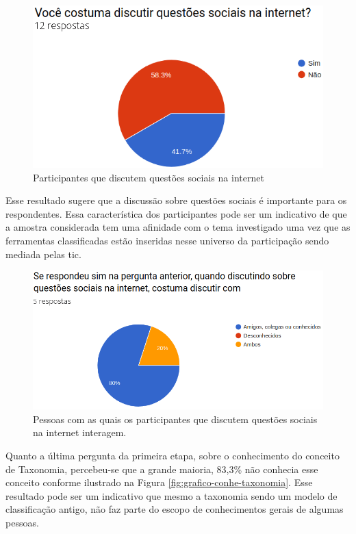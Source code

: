 \begin{figure}[!ht]
    \centering
    \includegraphics[scale=0.4]{./figuras/discutir.png}
    \caption{Participantes que discutem questões sociais na internet}
    \label{fig:grafico-discu}
\end{figure}

\par
Esse resultado sugere que a discussão sobre questões sociais é importante para os respondentes. Essa característica dos participantes pode ser um indicativo de que a amostra 
considerada tem uma afinidade com o tema investigado uma vez que as ferramentas classificadas estão inseridas nesse universo da participação sendo mediada pelas \acrshort{tic}. 

\begin{figure}[!ht]
    \centering
    \includegraphics[scale=0.4]{./figuras/discutir_com.png}
    \caption{Pessoas com as quais os participantes que discutem questões sociais na internet interagem.}
    \label{fig:grafico-discu-alvo}
\end{figure}

\par
Quanto a última pergunta da primeira etapa, sobre o conhecimento do conceito de Taxonomia, percebeu-se que a grande maioria, 83,3\% não conhecia esse conceito conforme ilustrado na 
Figura \ref{fig:grafico-conhe-taxonomia}. Esse resultado pode ser um indicativo que mesmo a taxonomia sendo um modelo de classificação antigo, 
não faz parte do escopo de conhecimentos gerais de algumas pessoas.

